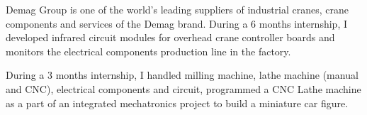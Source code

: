 \documentclass[10pt,a4paper]{altacv}
\begin{document}
\divider

Demag Group is one of the world's leading suppliers of industrial cranes, crane components and services of the Demag brand.
During a 6 months internship, I developed infrared circuit modules for overhead crane controller boards and monitors the electrical components production line in the factory.

\divider

During a 3 months internship, I handled milling machine, lathe machine (manual and CNC), electrical components and circuit, programmed a CNC Lathe machine as a part of an integrated mechatronics project to build a miniature car figure.

\divider

%



%
%
\end{document}
